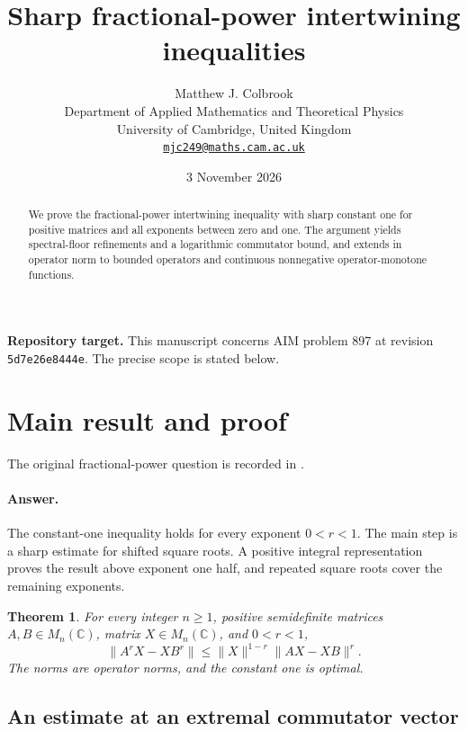 \documentclass[11pt,a4paper]{article}
\title{\textbf{Sharp fractional-power intertwining inequalities}}
\author{Matthew J. Colbrook\\[3pt]
{\small Department of Applied Mathematics and Theoretical Physics}\\
{\small University of Cambridge, United Kingdom}\\
{\small\href{mailto:mjc249@maths.cam.ac.uk}{\texttt{mjc249@maths.cam.ac.uk}}}}
\date{3 November 2026}
\newtheorem{theorem}{Theorem}[section]
\theoremstyle{remark}
\begin{document}
\maketitle
\begin{abstract}
We prove the fractional-power intertwining inequality with sharp constant one for positive matrices and all exponents between zero and one. The argument yields spectral-floor refinements and a logarithmic commutator bound, and extends in operator norm to bounded operators and continuous nonnegative operator-monotone functions.
\end{abstract}
\noindent\textbf{Repository target.}
This manuscript concerns AIM problem 897 at revision
\texttt{5d7e26e8444e}. The precise scope is stated below.
\medskip

\section{Main result and proof}
\label{sec:897}

The original fractional-power question is recorded in \cite[Problem X.5.3]{Bhatia1997}.


\paragraph{Answer.} The constant-one inequality holds for every exponent
$0<r<1$. The main step is a sharp estimate for shifted square roots. A
positive integral representation proves the result above exponent one
half, and repeated square roots cover the remaining exponents.

\begin{theorem}\label{thm:897}
For every integer $n\ge1$, positive semidefinite matrices
$A,B\in M_n(\mathbb C)$, matrix $X\in M_n(\mathbb C)$, and $0<r<1$,
\[
 \boxed{\quad
 \|A^rX-XB^r\|
 \le\|X\|^{1-r}\|AX-XB\|^r.
 \quad}
\]
The norms are operator norms, and the constant one is optimal.
\end{theorem}

\subsection{An estimate at an extremal commutator vector}
\end{document}
